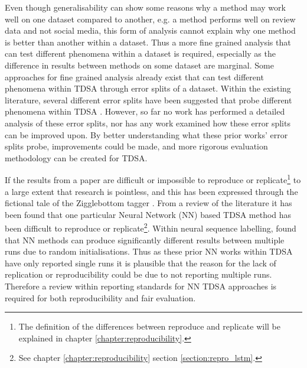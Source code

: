 Even though generalisability can show some reasons why a method may work well on one dataset compared to another, e.g. a method performs well on review data and not social media, this form of analysis cannot explain why one method is better than another within a dataset. Thus a more fine grained analysis that can test different phenomena within a dataset is required, especially as the difference in results between methods on some dataset are marginal. Some approaches for fine grained analysis already exist that can test different phenomena within TDSA through error splits of a dataset. Within the existing literature, several different error splits have been suggested that probe different phenomena within TDSA \citep{nguyen-shirai-2015-phrasernn,wang-etal-2017-tdparse,he-etal-2018-exploiting,yang2018multi}. However, so far no work has performed a detailed analysis of these error splits, nor has any work examined how these error splits can be improved upon. By better understanding what these prior works' error splits probe, improvements could be made, and more rigorous evaluation methodology can be created for TDSA.

If the results from a paper are difficult or impossible to reproduce or replicate\footnote{The definition of the differences between reproduce and replicate will be explained in chapter \ref{chapter:reproducibility}.} to a large extent that research is pointless, and this has been expressed through the fictional tale of the Zigglebottom tagger \citep{pedersen-2008-last}. From a review of the literature it has been found that one particular Neural Network (NN) based TDSA method has been difficult to reproduce or replicate\footnote{See chapter \ref{chapter:reproducibility} section \ref{section:repro_lstm}.}. Within neural sequence labelling, \citet{reimers-gurevych-2017-reporting} found that NN methods can produce significantly different results between multiple runs due to random initialisations. Thus as these prior NN works within TDSA have only reported single runs it is plausible that the reason for the lack of replication or reproducibility could be due to not reporting multiple runs. Therefore a review within reporting standards for NN TDSA approaches is required for both reproducibility and fair evaluation.

